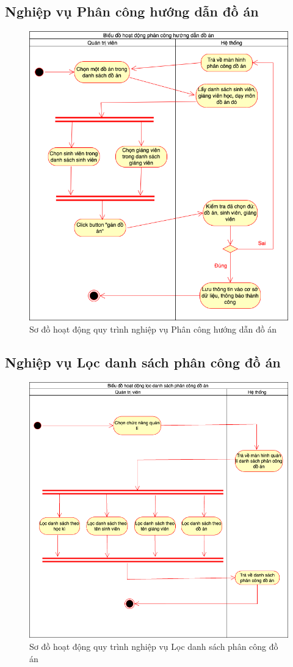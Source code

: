 \documentclass[../Main.tex]{subfiles}
\begin{document}
\subsection{Nghiệp vụ Phân công hướng dẫn đồ án}
\begin{figure}[H]
   \centering
    \includegraphics[width=0.75\linewidth]{Figure/qt_assign.png}
    \caption{Sơ đồ hoạt động quy trình nghiệp vụ Phân công hướng dẫn đồ án}
    \label{fig:qt_assign}
\end{figure}

\subsection{Nghiệp vụ Lọc danh sách phân công đồ án}

\begin{figure}[H]
   \centering
    \includegraphics[width=0.75\linewidth]{Figure/loc_ds_do_an.png}
    \caption{Sơ đồ hoạt động quy trình nghiệp vụ Lọc danh sách phân công đồ án}
    \label{fig:loc_ds_do_an}
\end{figure}
\end{document}
